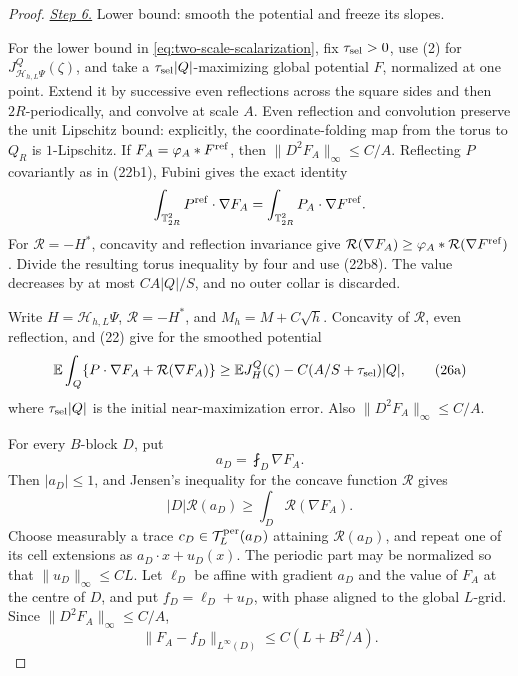 \documentclass{aomart}
\theoremstyle{definition}
\newcommand{\1}{\mathbf 1}
\begin{document}
\begin{proof}
\smallskip\noindent
\underline{\textit{Step 6.}} Lower bound: smooth the potential and freeze its slopes.

For the lower bound in \eqref{eq:two-scale-scalarization}, fix
$\tau_{\rm sel}>0$, use (2) for
$J_ {\mathcal H_ {h,L}\Psi}^Q(\zeta)$, and take a
$\tau_{\rm sel}|Q|$-maximizing global potential $F$, normalized at one point.
Extend it by successive even
reflections across the square sides and then $2R$-periodically, and
convolve at scale $A$.  Even reflection and convolution preserve the
unit Lipschitz bound: explicitly, the coordinate-folding map from the
torus to $Q_ R$ is $1$-Lipschitz.  If
$F_ A=\varphi_ A*F^{\rm ref}$, then
$\|D^2F_ A\|_ \infty\leq C/A$.  Reflecting $P$ covariantly as in
(22b1), Fubini gives the exact identity
\begin{equation*}
\int_ {\mathbb T_ {2R}^2}P^{\rm ref}\cdot\nabla F_ A
=\int_ {\mathbb T_ {2R}^2}P_ A\cdot\nabla F^{\rm ref}.
\end{equation*}
For $\mathcal R=-H^*$, concavity and reflection invariance give
$\mathcal R(\nabla F_ A)\geq\varphi_ A*\mathcal R(\nabla F^{\rm ref})$.  Divide the
resulting torus inequality by four and use (22b8).  The value decreases
by at most $CA|Q|/S$, and no outer collar is discarded.

Write $H=\mathcal H_ {h,L}\Psi$, $\mathcal R=-H^*$, and
$M_ h=M+C\sqrt h$.  Concavity of $\mathcal R$, even reflection, and (22) give
for the smoothed potential
\begin{equation}
\mathbb E\int_ Q\{P\cdot\nabla F_ A+\mathcal R(\nabla F_ A)\}
\geq\mathbb EJ_ H^Q(\zeta)-C(A/S+\tau_{\rm sel})|Q|,
\tag{26a}
\end{equation}
where $\tau_{\rm sel}|Q|$ is the initial near-maximization error.  Also
$\|D^2F_ A\|_ \infty\leq C/A$.

For every $B$-block $D$, put
\begin{equation*}
a_ D=\fint_ D\nabla F_ A.
\end{equation*}
Then $|a_ D|\leq1$, and Jensen's inequality for the concave function
$\mathcal R$ gives
\begin{equation}
|D|\mathcal R(a_ D)\geq\int_ D \mathcal R(\nabla F_ A).
\tag{26b}
\end{equation}
Choose measurably a trace $c_ D\in\mathcal T_ L^{\rm per}(a_ D)$
attaining $\mathcal R(a_ D)$, and repeat one of its cell extensions as
$a_ D\cdot x+u_ D(x)$.  The periodic part may be normalized so that
$\|u_ D\|_ \infty\leq CL$.  Let $\ell_ D$ be affine with gradient
$a_ D$ and the value of $F_ A$ at the centre of $D$, and put
$f_ D=\ell_ D+u_ D$, with phase aligned to the global $L$-grid.
Since $\|D^2F_ A\|_ \infty\leq C/A$,
\begin{equation}
\|F_ A-f_ D\|_ {L^\infty(D)}\leq C(L+B^2/A).
\tag{26c}
\end{equation}


\end{proof}
\end{document}
